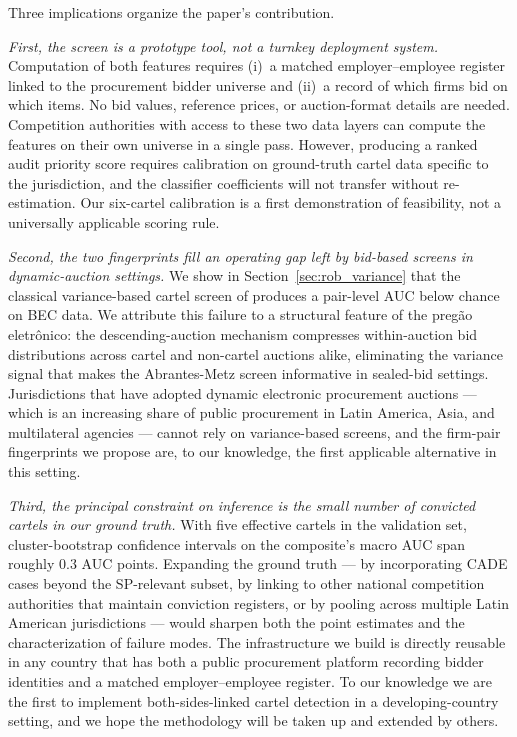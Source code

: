 Three implications organize the paper's contribution.

\emph{First, the screen is a prototype tool, not a turnkey deployment system.} Computation of both features requires (i)~a matched employer--employee register linked to the procurement bidder universe and (ii)~a record of which firms bid on which items. No bid values, reference prices, or auction-format details are needed. Competition authorities with access to these two data layers can compute the features on their own universe in a single pass. However, producing a ranked audit priority score requires calibration on ground-truth cartel data specific to the jurisdiction, and the classifier coefficients will not transfer without re-estimation. Our six-cartel calibration is a first demonstration of feasibility, not a universally applicable scoring rule.

\emph{Second, the two fingerprints fill an operating gap left by bid-based screens in dynamic-auction settings.} We show in Section~\ref{sec:rob_variance} that the classical variance-based cartel screen of \citet{abrantesmetz2006screening} produces a pair-level AUC below chance on BEC data. We attribute this failure to a structural feature of the preg\~{a}o eletr\^{o}nico: the descending-auction mechanism compresses within-auction bid distributions across cartel and non-cartel auctions alike, eliminating the variance signal that makes the Abrantes-Metz screen informative in sealed-bid settings. Jurisdictions that have adopted dynamic electronic procurement auctions --- which is an increasing share of public procurement in Latin America, Asia, and multilateral agencies --- cannot rely on variance-based screens, and the firm-pair fingerprints we propose are, to our knowledge, the first applicable alternative in this setting.

\emph{Third, the principal constraint on inference is the small number of convicted cartels in our ground truth.} With five effective cartels in the validation set, cluster-bootstrap confidence intervals on the composite's macro AUC span roughly $0.3$ AUC points. Expanding the ground truth --- by incorporating CADE cases beyond the SP-relevant subset, by linking to other national competition authorities that maintain conviction registers, or by pooling across multiple Latin American jurisdictions --- would sharpen both the point estimates and the characterization of failure modes. The infrastructure we build is directly reusable in any country that has both a public procurement platform recording bidder identities and a matched employer--employee register. To our knowledge we are the first to implement both-sides-linked cartel detection in a developing-country setting, and we hope the methodology will be taken up and extended by others.

